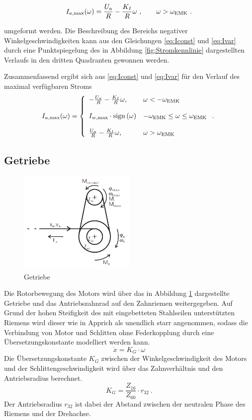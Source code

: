 \begin{equation}
	I_{a \mathrm{, max}}(\omega) = \frac{U_a}{R} - \frac{K_I}{R} \omega \ , \qquad \omega > \omega_{\mathrm{EMK}} \ .
	\label{eq:Ivar}
\end{equation}

umgeformt werden.
Die Beschreibung des Bereichs negativer Winkelgeschwindigkeiten kann aus den Gleichungen \eqref{eq:Iconst} und \eqref{eq:Ivar} durch eine Punktspiegelung des in Abbildung \ref{fig:Stromkennlinie} dargestellten Verlaufs in den dritten Quadranten gewonnen werden.

Zusammenfassend ergibt sich aus \eqref{eq:Iconst} und \eqref{eq:Ivar} für den Verlauf des maximal verfügbaren Stroms  
\[
I_{a \mathrm{, max}}(\omega) = \left\{\begin{array}{lll}
														-\frac{U_a}{R} - \frac{K_I}{R} \omega, & \omega < -\omega_{\mathrm{EMK}}   \\ \\
														I_{w\mathrm{, max}} \cdot \mathrm{sign}\left(\omega\right) 	& -\omega_{\mathrm{EMK}} \leq \omega \leq \omega_{\mathrm{EMK}} \\ \\				
														\frac{U_a}{R} - \frac{K_I}{R} \omega, & \omega > \omega_{\mathrm{EMK}} \end{array}\right. . \
\] 

\subsection{Getriebe}

\begin{figure}[htbp]
	\centering
		\includegraphics[width=0.5\textwidth]{Bilder/Modellierung/Getriebe.PNG}
	\caption{Getriebe \cite{franke}}
	\label{fig:Getriebe}
\end{figure}

Die Rotorbewegung des Motors wird über das in Abbildung \ref{fig:Getriebe} dargestellte Getriebe und das Antriebszahnrad auf den Zahnriemen weitergegeben. Auf Grund der hohen Steifigkeit des mit eingebetteten Stahlseilen unterstützten Riemens wird dieser wie in Apprich \cite{apprich} als unendlich starr angenommen, sodass die Verbindung von Motor und Schlitten ohne Federkopplung durch eine Übersetzungskonstante modelliert werden kann.
\[
	\dot{x} = K_G \cdot \omega
\]
 Die Übersetzungskonstante $K_G$ zwischen der Winkelgeschwindigkeit des Motors und der Schlittengeschwindigkeit wird über das Zahnverhältnis und den Antriebsradius berechnet.
\[
	K_G =  \frac{Z_{16}}{Z_{60}} \cdot r_{32} \ .
\]
Der Antriebsradius $r_{32}$ ist dabei der Abstand zwischen der neutralen Phase des Riemens und der Drehachse.